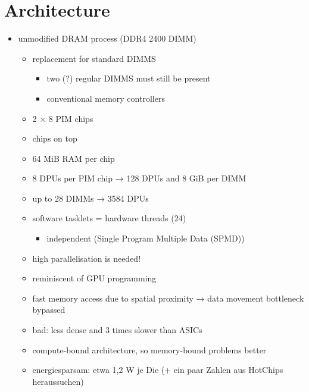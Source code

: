 \section{Architecture}
\label{sec:prereq:architecture}

\begin{itemize}
	\item
	unmodified DRAM process (DDR4 2400 DIMM)
	\begin{itemize}
		\item
		replacement for standard DIMMS
		\begin{itemize}
			\item
			two (?) regular DIMMS must still be present

			\item
			conventional memory controllers
		\end{itemize}

		\item
		2 × 8 PIM chips

		\item
		chips on top

		\item
		64 MiB RAM per chip

		\item
		8 DPUs per PIM chip → 128 DPUs and 8 GiB per DIMM

		\item
		up to 28 DIMMs → 3584 DPUs

		\item
		software tasklets = hardware threads (24)
		\begin{itemize}
			\item
			independent (Single Program Multiple Data (SPMD))
		\end{itemize}

		\item
		high parallelisation is needed!

		\item
		reminiscent of GPU programming

		\item
		fast memory access due to spatial proximity → data movement bottleneck bypassed

		\item
		bad:
		less dense and 3 times slower than ASICs

		\item
		compute-bound architecture, so memory-bound problems better

		\item
		energiesparsam:
		etwa 1,2 W je Die
		(+ ein paar Zahlen aus HotChips heraussuchen)
	\end{itemize}


\end{itemize}
